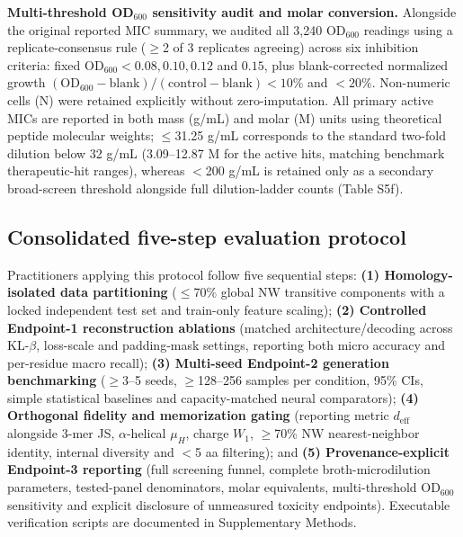 \documentclass[unnumsec,webpdf,contemporary,large]{oup-authoring-template}
\newcommand{\rev}[1]{#1}
\begin{document}
\rev{\textbf{Multi-threshold OD$_{600}$ sensitivity audit and molar conversion.} Alongside the original reported MIC summary, we audited all 3,240 OD$_{600}$ readings using a replicate-consensus rule ($\geq$2 of 3 replicates agreeing) across six inhibition criteria: fixed OD$_{600} < 0.08, 0.10, 0.12$ and $0.15$, plus blank-corrected normalized growth $(\mathrm{OD}_{600}-\mathrm{blank})/(\mathrm{control}-\mathrm{blank}) < 10\%$ and $<20\%$. Non-numeric cells (N) were retained explicitly without zero-imputation. All primary active MICs are reported in both mass (\textmu{}g/mL) and molar (\textmu{}M) units using theoretical peptide molecular weights; $\leq$31.25 \textmu{}g/mL corresponds to the standard two-fold dilution below 32 \textmu{}g/mL (3.09--12.87 \textmu{}M for the active hits, matching benchmark therapeutic-hit ranges), whereas $<$200 \textmu{}g/mL is retained only as a secondary broad-screen threshold alongside full dilution-ladder counts (Table S5f).}

\rev{\subsection{Consolidated five-step evaluation protocol}}
\rev{Practitioners applying this protocol follow five sequential steps: \textbf{(1) Homology-isolated data partitioning} ($\leq$70\% global NW transitive components with a locked independent test set and train-only feature scaling); \textbf{(2) Controlled Endpoint-1 reconstruction ablations} (matched architecture/decoding across KL-$\beta$, loss-scale and padding-mask settings, reporting both micro accuracy and per-residue macro recall); \textbf{(3) Multi-seed Endpoint-2 generation benchmarking} ($\geq$3--5 seeds, $\geq$128--256 samples per condition, 95\% CIs, simple statistical baselines and capacity-matched neural comparators); \textbf{(4) Orthogonal fidelity and memorization gating} (reporting metric $d_{\mathrm{eff}}$ alongside 3-mer JS, $\alpha$-helical $\mu_H$, charge $W_1$, $\geq$70\% NW nearest-neighbor identity, internal diversity and $<$5 aa filtering); and \textbf{(5) Provenance-explicit Endpoint-3 reporting} (full screening funnel, complete broth-microdilution parameters, tested-panel denominators, molar equivalents, multi-threshold OD$_{600}$ sensitivity and explicit disclosure of unmeasured toxicity endpoints). Executable verification scripts are documented in Supplementary Methods.}
\end{document}
